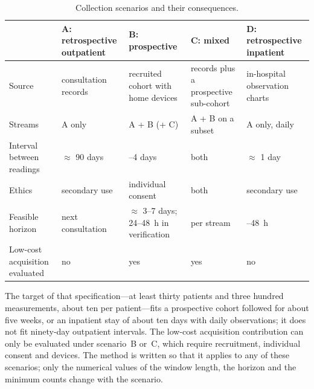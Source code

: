 \begin{table}[htbp]
\centering\footnotesize
\caption{Collection scenarios and their consequences.}\label{tab:scenarios}
\begin{tabularx}{\textwidth}{@{}>{\raggedright\arraybackslash}p{2.3cm} >{\raggedright\arraybackslash}X >{\raggedright\arraybackslash}X >{\raggedright\arraybackslash}X >{\raggedright\arraybackslash}X@{}}
\toprule
 & \textbf{A: retrospective outpatient} & \textbf{B: prospective} & \textbf{C: mixed} & \textbf{D: retrospective inpatient} \\
\midrule
Source & consultation records & recruited cohort with home devices & records plus a prospective sub-cohort & in-hospital observation charts \\
Streams & A only & A + B (+ C) & A + B on a subset & A only, daily \\
Interval between readings & $\approx$ 90 days & 3--4 days & both & $\approx$ 1 day \\
Ethics & secondary use & individual consent & both & secondary use \\
Feasible horizon & next consultation & $\approx$ 3--7 days; 24--48~h in verification & per stream & 24--48~h \\
Low-cost acquisition evaluated & no & yes & yes & no \\
\bottomrule
\end{tabularx}
\end{table}

The target of that specification---at least thirty patients and three hundred measurements, about ten per patient---fits a prospective cohort followed for about five weeks, or an inpatient stay of about ten days with daily observations; it does not fit ninety-day outpatient intervals. The low-cost acquisition contribution can only be evaluated under scenario~B or~C, which require recruitment, individual consent and devices. The method is written so that it applies to any of these scenarios; only the numerical values of the window length, the horizon and the minimum counts change with the scenario.

